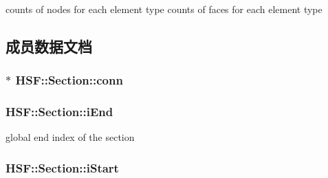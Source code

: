 counts of nodes for each element type counts of faces for each element type 

\subsection{成员数据文档}
\hypertarget{classHSF_1_1Section_a21e40283b7ab3f9a90264724747b18b1}{
\subsubsection[{conn}]{ $\ast$ {\bf HSF::Section::conn}}}
\label{classHSF_1_1Section_a21e40283b7ab3f9a90264724747b18b1}
\hypertarget{classHSF_1_1Section_aa55c4d1b564b144f7d35057210282c44}{
\subsubsection[{iEnd}]{ {\bf HSF::Section::iEnd}}}
\label{classHSF_1_1Section_aa55c4d1b564b144f7d35057210282c44}


global end index of the section \hypertarget{classHSF_1_1Section_a66f4b950c76813c20b8dc8c0cc6626a2}{
\subsubsection[{iStart}]{ {\bf HSF::Section::iStart}}}
\label{classHSF_1_1Section_a66f4b950c76813c20b8dc8c0cc6626a2}


